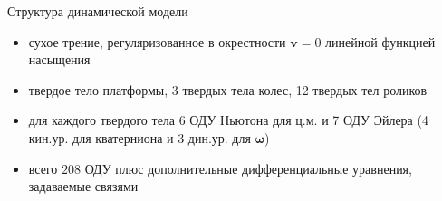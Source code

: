 \begin{frame}{Структура динамической модели}
    \begin{itemize}
        \item сухое трение, регуляризованное в окрестности $\mathbf{v} = 0$ линейной функцией насыщения
        \item твердое тело платформы, 3 твердых тела колес, 12 твердых тел роликов
        \item для каждого твердого тела 6 ОДУ Ньютона для ц.м. и 7 ОДУ Эйлера (4 кин.ур. для кватерниона и 3 дин.ур. для $\mathbf{\omega}$)
        \item всего $208$ ОДУ плюс дополнительные дифференциальные уравнения, задаваемые связями
    \end{itemize}
\end{frame}

